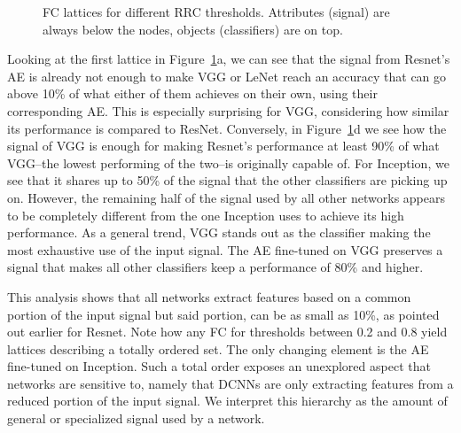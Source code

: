 \documentclass[10pt,twocolumn,a4paper]{article}
\begin{document}
\begin{figure}
	\footnotesize
	\hfill
	\subfloat[$t=0.1$]{} 
	\hfill
	\subfloat[$t=0.2$]{}
	\hfill
	\subfloat[$t=0.8$]{}
	\hfill
	\subfloat[$t=0.9$]{}
	\hfill
	\caption{FC lattices for different RRC thresholds. Attributes (signal) are always below the nodes, objects (classifiers) are on top.}
	\label{fig:lattices}
\end{figure}

Looking at the first lattice in Figure~\ref{fig:lattices}a, we can see that the signal from Resnet's AE is already not enough to make VGG or LeNet reach an accuracy that can go above 10\% of what either of them achieves on their own, using their corresponding AE.
This is especially surprising for VGG, considering how similar its performance is compared to ResNet.
Conversely, in Figure~\ref{fig:lattices}d we see how the signal of VGG is enough for making Resnet's performance at least 90\% of what VGG--the lowest performing of the two--is originally capable of.
For Inception, we see that it shares up to 50\% of the signal that the other classifiers are picking up on.
However, the remaining half of the signal used by all other networks appears to be completely different from the one Inception uses to achieve its high performance.
As a general trend, VGG stands out as the classifier making the most exhaustive use of the input signal.
The AE fine-tuned on VGG preserves a signal that makes all other classifiers keep a performance of 80\% and higher.

This analysis shows that all networks extract features based on a common portion of the input signal but said portion, can be as small as 10\%, as pointed out earlier for Resnet.
Note how any FC for thresholds between 0.2 and 0.8 yield lattices describing a totally ordered set.
The only changing element is the AE fine-tuned on Inception.
Such a total order exposes an unexplored aspect that networks are sensitive to, namely that DCNNs are only extracting features from a reduced portion of the input signal.
We interpret this hierarchy as the amount of general or specialized signal used by a network.
\end{document}
